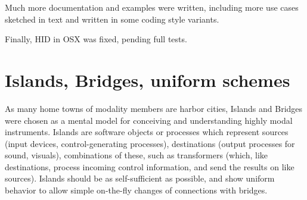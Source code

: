 \documentclass{article}
\begin{document}
\begin{description}
Much more documentation and examples were written, including more use cases sketched in text and written in some coding style variants.

Finally, HID in OSX was fixed, pending full tests.



\end{description}


\section{Islands, Bridges, uniform schemes}
\label{sec:islands_and_bridges_uniform_protocols}
As many home towns of modality members are harbor cities, Islands and Bridges were chosen as a mental model for conceiving and understanding highly modal instruments.
Islands are software objects or processes which represent sources (input devices, control-generating processes), destinations (output processes for sound, visuals), combinations of these, such as transformers (which, like destinations, process incoming control information, and send the results on like sources). 
Islands should be as self-sufficient as possible, and show uniform behavior to allow simple on-the-fly changes of connections with bridges. 
\end{document}
